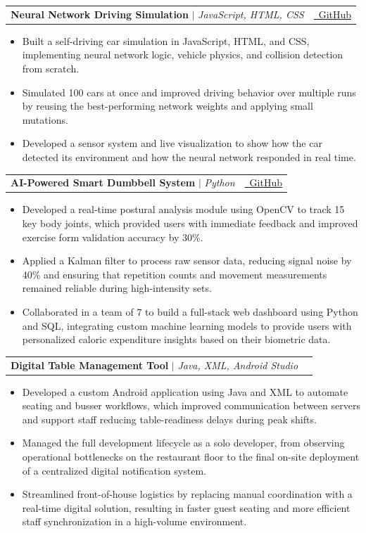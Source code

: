 \documentclass[letterpaper,10.5pt]{article}
\makeatletter
\newcommand{\resumeItem}[1]{
  \item\small{
    {#1 \vspace{-2pt}}
  }
}
\newcommand{\resumeProjectHeading}[2]{
    \item
    \begin{tabular*}{0.97\textwidth}{l@{\extracolsep{\fill}}r}
      \small#1 & #2 \\
    \end{tabular*}\vspace{-7pt}
}
\newcommand{\resumeItemListStart}{\begin{itemize}}
\newcommand{\resumeItemListEnd}{\end{itemize}\vspace{-5pt}}
\makeatother
\begin{document}
    \resumeProjectHeading
          {\textbf{Neural Network Driving Simulation} $|$ \emph{JavaScript, HTML, CSS}}{\href{https://github.com/ObaidaKandakji/Neural-Network-and-machine-learning-Demo}{\faGithub\ GitHub}}
          \resumeItemListStart
            \resumeItem{Built a self-driving car simulation in JavaScript, HTML, and CSS, implementing neural network logic, vehicle physics, and collision detection from scratch.}
            \resumeItem{Simulated 100 cars at once and improved driving behavior over multiple runs by reusing the best-performing network weights and applying small mutations.}
            \resumeItem{Developed a sensor system and live visualization to show how the car detected its environment and how the neural network responded in real time.}
          \resumeItemListEnd

    \resumeProjectHeading
          {\textbf{AI-Powered Smart Dumbbell System} $|$ \emph{Python}}{\href{https://github.com/nasrAnthony/Capstone-4912}{\faGithub\ GitHub}}
            \resumeItemListStart
            \resumeItem{Developed a real-time postural analysis module using OpenCV to track 15 key body joints, which provided users with immediate feedback and improved exercise form validation accuracy by 30\%.}
            \resumeItem{Applied a Kalman filter to process raw sensor data, reducing signal noise by 40\% and ensuring that repetition counts and movement measurements remained reliable during high-intensity sets.}
            \resumeItem{Collaborated in a team of 7 to build a full-stack web dashboard using Python and SQL, integrating custom machine learning models to provide users with personalized caloric expenditure insights based on their biometric data.}
          \resumeItemListEnd 
          
    \resumeProjectHeading
          {\textbf{Digital Table Management Tool} $|$ \emph{Java, XML, Android Studio}}{}
            \resumeItemListStart
            \resumeItem{Developed a custom Android application using Java and XML to automate seating and busser workflows, which improved communication between servers and support staff reducing table-readiness delays during peak shifts.}
            \resumeItem{Managed the full development lifecycle as a solo developer, from observing operational bottlenecks on the restaurant floor to the final on-site deployment of a centralized digital notification system.}
            \resumeItem{Streamlined front-of-house logistics by replacing manual coordination with a real-time digital solution, resulting in faster guest seating and more efficient staff synchronization in a high-volume environment.}
          \resumeItemListEnd
    
\end{document}
